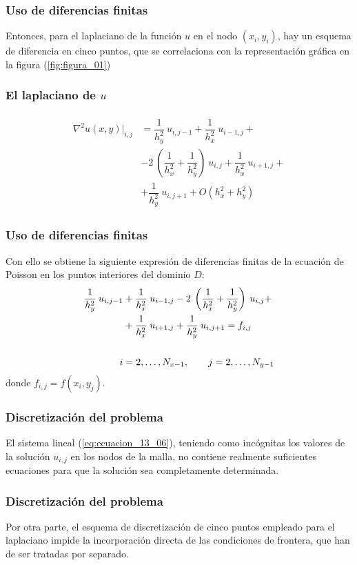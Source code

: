 \begin{frame}
\frametitle{Uso de diferencias finitas}
Entonces, para el laplaciano de la función $u$ en el nodo $(x_{i}, y_{i})$, hay un esquema de diferencia en cinco puntos, que se correlaciona con la representación gráfica en la figura (\ref{fig:figura_01})
\end{frame}
\begin{frame}
\frametitle{El laplaciano de $u$}
\begin{align}
\begin{aligned}
\nabla^{2} u(x,y) \vert_{i,j} &= \dfrac{1}{h_{y}^{2}} \: u_{i, j-1} + \dfrac{1}{h_{x}^{2}} \: u_{i-1, j} + \\
&- 2 \: \left( \dfrac{1}{h_{x}^{2}} + \dfrac{1}{h_{y}^{2}} \right) \: u_{i, j}  + \dfrac{1}{h_{x}^{2}} \: u_{i+1, j}  + \\
&+ \dfrac{1}{h_{y}^{2}} \: u_{i, j+1} + O(h_{x}^{2} + h_{y}^{2})
\end{aligned}
\label{eq:ecuacion_13_05}
\end{align}
\end{frame}
\begin{frame}
\frametitle{Uso de diferencias finitas}
Con ello se obtiene la siguiente expresión de diferencias finitas de la ecuación de Poisson en los puntos interiores del dominio $D$:
\begin{align}
\begin{aligned}
\dfrac{1}{h_{y}^{2}} \: u_{i, j-1} &+ \dfrac{1}{h_{x}^{2}} \: u_{i-1, j} - 2 \: \left( \dfrac{1}{h_{x}^{2}} + \dfrac{1}{h_{y}^{2}} \right) \: u_{i, j} + \\
&+ \dfrac{1}{h_{x}^{2}} \: u_{i+1, j} + \dfrac{1}{h_{y}^{2}} \: u_{i, j+1} = f_{i, j} \\
\\
i &= 2, \ldots, N_{x-1}, \hspace{0.7cm} j = 2, \ldots, N_{y-1}
\end{aligned}
\label{eq:ecuacion_13_06}
\end{align}
donde $f_{i, j} = f(x_{i}, y_{j})$.
\end{frame}
\begin{frame}
\frametitle{Discretización del problema}
El sistema lineal (\ref{eq:ecuacion_13_06}), teniendo como incógnitas los valores de la solución $u_{i, j}$ en los nodos de la malla, no contiene realmente suficientes ecuaciones para que la solución sea completamente determinada. 
\end{frame}
\begin{frame}
\frametitle{Discretización del problema}
Por otra parte, el esquema de discretización de cinco puntos empleado para el laplaciano impide la incorporación directa de las condiciones de frontera, que han de ser tratadas por separado.
\end{frame}
